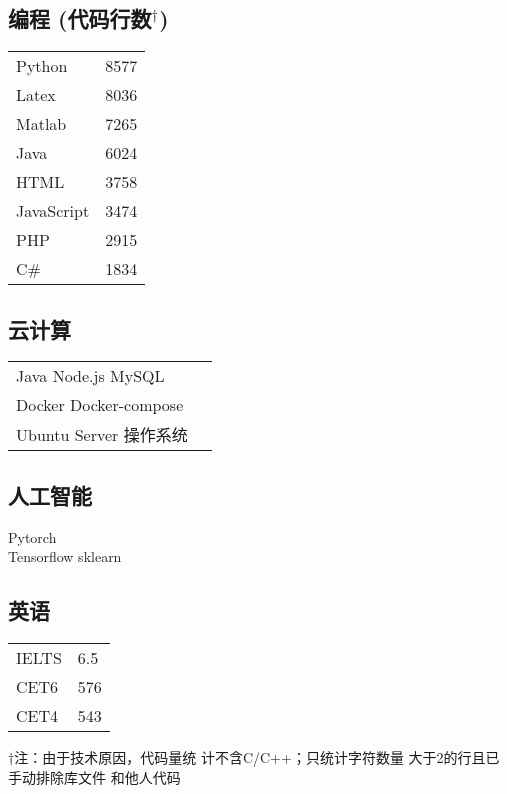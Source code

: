 \documentclass[]{deedy-resume-openfont}
\begin{document}
\begin{minipage}[t]{0.25\textwidth}
	\subsection{编程 {\small (代码行数$^\dag$)}}
	\begin{tabular}{ll}
		Python     & 8577  \\
		Latex      & 8036  \\
		Matlab     & 7265  \\
		Java       & 6024  \\
		HTML       & 3758  \\
		JavaScript & 3474  \\
		PHP        & 2915  \\
		C\#        & 1834  \\
	\end{tabular}
	\sectionsep
    
	\subsection{云计算}
	\begin{tabular}{ll}
		Java \textbullet{} Node.js \textbullet{} MySQL &\\
		Docker \textbullet{} Docker-compose &\\
		Ubuntu Server 操作系统  &\\
	\end{tabular}
	\sectionsep

	\subsection{人工智能}
	Pytorch \\
	Tensorflow \textbullet{} sklearn \\
	\sectionsep
	
	\subsection{英语}
	\begin{tabular}{ll}
		IELTS & 6.5 \\
		CET6  & 576 \\
		CET4  & 543 \\
	\end{tabular}
	\sectionsep
	\sectionsep
	\sectionsep
	
	{\small $\dag$注：由于技术原因，代码量统 计不含C/C++；只统计字符数量 大于2的行且已手动排除库文件 和他人代码}

\end{minipage}
\end{document}
